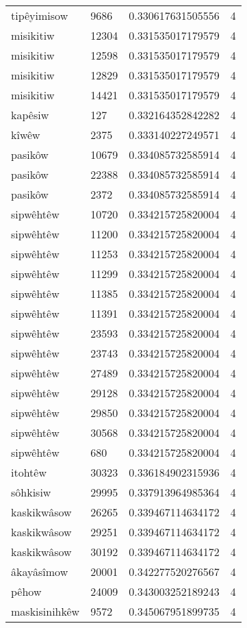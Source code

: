 \begin{longtable}{llll}
tipêyimisow & 9686 & 0.330617631505556 & 4 \\
misikitiw & 12304 & 0.331535017179579 & 4 \\
misikitiw & 12598 & 0.331535017179579 & 4 \\
misikitiw & 12829 & 0.331535017179579 & 4 \\
misikitiw & 14421 & 0.331535017179579 & 4 \\
kapêsiw & 127 & 0.332164352842282 & 4 \\
kîwêw & 2375 & 0.333140227249571 & 4 \\
pasikôw & 10679 & 0.334085732585914 & 4 \\
pasikôw & 22388 & 0.334085732585914 & 4 \\
pasikôw & 2372 & 0.334085732585914 & 4 \\
sipwêhtêw & 10720 & 0.334215725820004 & 4 \\
sipwêhtêw & 11200 & 0.334215725820004 & 4 \\
sipwêhtêw & 11253 & 0.334215725820004 & 4 \\
sipwêhtêw & 11299 & 0.334215725820004 & 4 \\
sipwêhtêw & 11385 & 0.334215725820004 & 4 \\
sipwêhtêw & 11391 & 0.334215725820004 & 4 \\
sipwêhtêw & 23593 & 0.334215725820004 & 4 \\
sipwêhtêw & 23743 & 0.334215725820004 & 4 \\
sipwêhtêw & 27489 & 0.334215725820004 & 4 \\
sipwêhtêw & 29128 & 0.334215725820004 & 4 \\
sipwêhtêw & 29850 & 0.334215725820004 & 4 \\
sipwêhtêw & 30568 & 0.334215725820004 & 4 \\
sipwêhtêw & 680 & 0.334215725820004 & 4 \\
itohtêw & 30323 & 0.336184902315936 & 4 \\
sôhkisiw & 29995 & 0.337913964985364 & 4 \\
kaskikwâsow & 26265 & 0.339467114634172 & 4 \\
kaskikwâsow & 29251 & 0.339467114634172 & 4 \\
kaskikwâsow & 30192 & 0.339467114634172 & 4 \\
âkayâsîmow & 20001 & 0.342277520276567 & 4 \\
pêhow & 24009 & 0.343003252189243 & 4 \\
maskisinihkêw & 9572 & 0.345067951899735 & 4 \\

\end{longtable}
